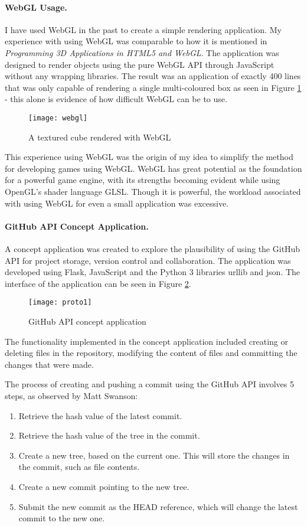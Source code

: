 \paragraph{WebGL Usage.}
I have used WebGL in the past to create a simple rendering application. My experience with using WebGL was comparable to how it is mentioned in \emph{Programming 3D Applications in HTML5 and WebGL}\cite{parisi2014programming}. The application was designed to render objects using the pure WebGL API through JavaScript without any wrapping libraries. The result was an application of exactly 400 lines that was only capable of rendering a single multi-coloured box as seen in Figure \ref{fig:webgl} - this alone is evidence of how difficult WebGL can be to use.

\begin{figure}[h]
	\centering
	\texttt{[image: webgl]}
	\caption{A textured cube rendered with WebGL}
	\label{fig:webgl}
\end{figure}

This experience using WebGL was the origin of my idea to simplify the method for developing games using WebGL. WebGL has great potential as the foundation for a powerful game engine, with its strengths becoming evident while using OpenGL's shader language GLSL. Though it is powerful, the workload associated with using WebGL for even a small application was excessive.

\paragraph{GitHub API Concept Application.}
A concept application was created to explore the plausibility of using the GitHub API for project storage, version control and collaboration. The application was developed using Flask, JavaScript and the Python 3 libraries urllib and json. The interface of the application can be seen in Figure \ref{fig:proto1}.

\begin{figure}[h]
	\centering
	\texttt{[image: proto1]}
	\caption{GitHub API concept application}
	\label{fig:proto1}
\end{figure}

The functionality implemented in the concept application included creating or deleting files in the repository, modifying the content of files and committing the changes that were made.

The process of creating and pushing a commit using the GitHub API involves 5 steps, as observed by Matt Swanson\cite{githubapicommit}:
\begin{enumerate}
	\item Retrieve the hash value of the latest commit.
	\item Retrieve the hash value of the tree in the commit.
	\item Create a new tree, based on the current one. This will store the changes in the commit, such as file contents.
	\item Create a new commit pointing to the new tree.
	\item Submit the new commit as the HEAD reference, which will change the latest commit to the new one.
\end{enumerate}

